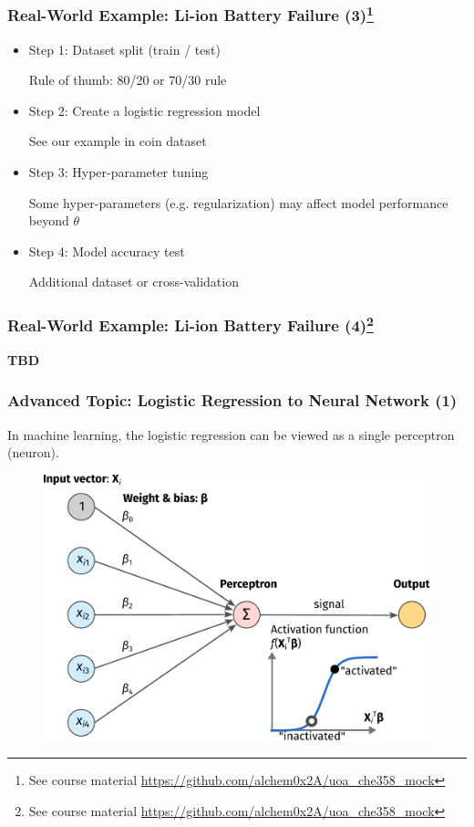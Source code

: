 \documentclass[10pt,aspectratio=169]{beamer}
\begin{document}
      \begin{frame}
        \frametitle{Real-World Example: Li-ion Battery Failure (3)\let\thefootnote\relax\footnote{{\tiny See course material \url{https://github.com/alchem0x2A/uoa_che358_mock}}}}

        \begin{itemize}
        \item Step 1: Dataset split (train / test)

              Rule of thumb: 80/20 or 70/30 rule
          
        \item Step 2: Create a logistic regression model

              See our example in coin dataset
          
        \item Step 3: Hyper-parameter tuning

          Some hyper-parameters (e.g. regularization) may affect model performance beyond $\theta$
          
        \item Step 4: Model accuracy test

          Additional dataset or cross-validation
        \end{itemize}
        
        
      \end{frame}

      \begin{frame}
        \frametitle{Real-World Example: Li-ion Battery Failure (4)\let\thefootnote\relax\footnote{{\tiny See course material \url{https://github.com/alchem0x2A/uoa_che358_mock}}}}

        \textbf{TBD}
        
        
      \end{frame}

      \begin{frame}
        \frametitle{Advanced Topic: Logistic Regression to Neural Network (1)}
        In machine learning, the logistic regression can be viewed as
        a single perceptron (neuron).

        \begin{figure}[t]
          \includegraphics[width=0.65\linewidth]{images/nn-1.pdf}
        \end{figure}

        
      \end{frame}
\end{document}
